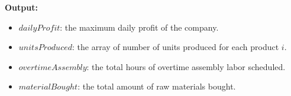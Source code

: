 \documentclass{article}
\begin{document}
\textbf{Output:}
\begin{itemize}
    \item $dailyProfit$: the maximum daily profit of the company.
    \item $unitsProduced$: the array of number of units produced for each product $i$.
    \item $overtimeAssembly$: the total hours of overtime assembly labor scheduled.
    \item $materialBought$: the total amount of raw materials bought.
\end{itemize}
\end{document}
